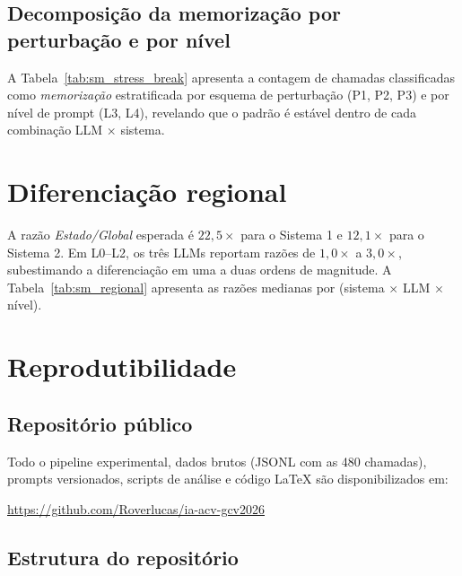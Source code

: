 \documentclass[12pt,a4paper]{article}
\begin{document}


\subsection{Decomposição da memorização por perturbação e por nível}

A Tabela~\ref{tab:sm_stress_break} apresenta a contagem de chamadas classificadas como \emph{memorização} estratificada por esquema de perturbação (P1, P2, P3) e por nível de prompt (L3, L4), revelando que o padrão é estável dentro de cada combinação LLM $\times$ sistema.



\section{Diferenciação regional}

A razão \emph{Estado/Global} esperada é $22{,}5\times$ para o Sistema 1 e $12{,}1\times$ para o Sistema 2. Em L0--L2, os três LLMs reportam razões de $1{,}0\times$ a $3{,}0\times$, subestimando a diferenciação em uma a duas ordens de magnitude. A Tabela~\ref{tab:sm_regional} apresenta as razões medianas por (sistema $\times$ LLM $\times$ nível).



\section{Reprodutibilidade}

\subsection{Repositório público}

Todo o pipeline experimental, dados brutos (JSONL com as 480 chamadas), prompts versionados, scripts de análise e código LaTeX são disponibilizados em:

\begin{center}
\url{https://github.com/Roverlucas/ia-acv-gcv2026}
\end{center}

\subsection{Estrutura do repositório}
\end{document}
